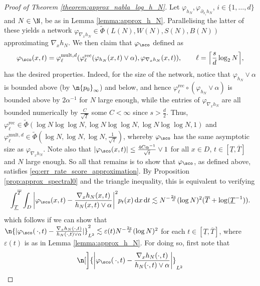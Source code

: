 \documentclass[a4paper, 11pt, headings = small, abstract]{scrartcl}
\begin{document}
\begin{proof}[Proof of Theorem \ref{theorem:approx_nabla_log_h_N}]
Let $\varphi_{h_N},\varphi_{\partial_{x_i} h_N}$, $i\in\{1, \ldots, d\}$ and $N\in\N$, be as in Lemma \ref{lemma:approx_h_N}.
	Parallelising the latter of these yields a network $\varphi_{\nabla_xh_N}\in\widetilde{\Phi}(L(N), W(N), S(N), B(N))$ approximating $\nabla_xh_N$.
	We then claim that $\varphi_{\sco}$ defined as
	\[
		\varphi_{\sco}(x, t)
		=\varphi^{\mathrm{mult}, d}_{\ell}(\varphi^{\mathrm{rec}}_{\ell}(\varphi_{h_N}(x, t)\vee\alpha), \varphi_{\nabla_xh_N}(x, t)),\qquad
		\ell
		=\Big\lceil\frac{s}{d}\log_2N\Big\rceil,
	\]
	has the desired properties.
	Indeed, for the size of the network, notice that $\varphi_{h_N}\vee\alpha$ is bounded above (by $\n{p_0}_{\infty}$) and below, and hence $\varphi^{\mathrm{rec}}_{\ell}\circ(\varphi_{h_N}\vee\alpha)$ is bounded above by $2\alpha^{-1}$ for $N$ large enough, while the entries of $\varphi_{\nabla_x h_N}$ are all bounded numerically by $\frac{C}{\sqrt{\underline{T}}}$ some $C<\infty$ since $s>\frac{d}{2}$.
	Thus, $\varphi_{\ell}^\mathrm{rec}\in\widetilde{\Phi}(\log N\log\log N, \log N\log\log N, \log N\log\log N, 1)$ and $\varphi^{\mathrm{mult},d}_{\ell}\in\widetilde{\Phi}(\log N, \log N, \log N, \frac{1}{\sqrt{\underline{T}}})$, whereby $\varphi_{\sco}$ has the same asymptotic size as $\varphi_{\nabla_xh_N}$.
        Note also that $|\varphi_\sco(x, t)|\le \frac{4C\alpha^{-1}}{\sqrt{t}}\vee1$ for all $x\in D$, $t\in[\underline{T},\overline{T}]$ and $N$ large enough.
So all that remains is to show that $\varphi_\sco$, as defined above, satisfies \eqref{eq:err_rate_score_approximation}.
	By Proposition \ref{prop:approx_spectral0} and the triangle inequality, this is equivalent to verifying
	\begin{equation*}
		\int_{\underline{T}}^{\overline{T}}\int_D
		\bigg|\varphi_{\sco}(x,t)-\frac{\nabla_xh_N(x,t)}{h_N(x,t)\vee\alpha}\bigg|^2p_t(x)\,\mathrm{d}x\,\mathrm{d}t
		\lesssim N^{-\frac{2s}{d}}(\log N)^2(\overline{T}+\log(\underline{T}^{-1})).
	\end{equation*}
	which follows if we can show that $\n{|\varphi_\sco(\,\cdot,t)-\frac{\nabla_x h_N(\cdot, t)}{h_N(\cdot, t)\vee\alpha}|}_{L^2}^2\lesssim \varepsilon(t)N^{-\frac{2s}{d}}(\log N)^2$ for each $t\in[\underline{T},\overline{T}]$, where $\varepsilon(t)$ is as in Lemma \ref{lemma:approx_h_N}.
For doing so, first note that
	\begin{align*}
		\n[\bigg]{\bigg|\varphi_\sco(\,\cdot,t)-\frac{\nabla_x h_N(\cdot, t)}{h_N(\cdot, t)\vee\alpha}\bigg|}_{L^2}

\end{align*}
\end{proof}
\end{document}

